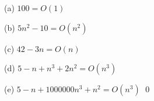 
(a) $100 = O(1)$

(b) $5n^2 - 10 = O(n^2)$

(c) $42 - 3n = O(n)$

(d) $5 - n + n^3 + 2n^2 = O(n^3)$

(e) $5 - n + 1000000n^3 + n^2 = O(n^3)$
\qed

